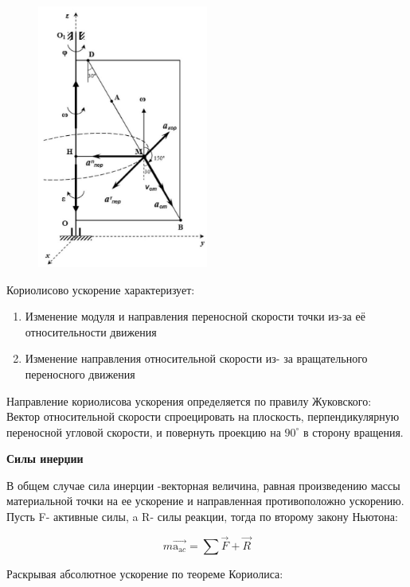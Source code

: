 \begin{figure}[h!]
    \centering
    \includegraphics[width=0.5\textwidth]{2023_05_21_6e9b4e8657e82b213c6ag-08(1)}
\end{figure}


Кориолисово ускорение характеризует:

\begin{enumerate}
  \item Изменение модуля и направления переносной скорости точки из-за её относительности движения

  \item Изменение направления относительной скорости из- за вращательного переносного движения
\end{enumerate}

Направление кориолисова ускорения определяется по правилу Жуковского: 
Вектор относительной скорости спроецировать на плоскость, перпендикулярную переносной угловой скорости, и повернуть проекцию на $90^{\circ}$ в сторону вращения.

\textbf{Силы инерџии}


В общем случае сила инерции -векторная величина, равная произведению массы материальной точки на ее ускорение и направленная противоположно ускорению. Пусть F- активные силы, a R- силы реакции, тогда по второму закону Ньютона:

$$
m \overrightarrow{\mathrm{a}_{\mathrm{a} c}}=\sum \vec{F}+\vec{R}
$$

Раскрывая абсолютное ускорение по теореме Кориолиса:

